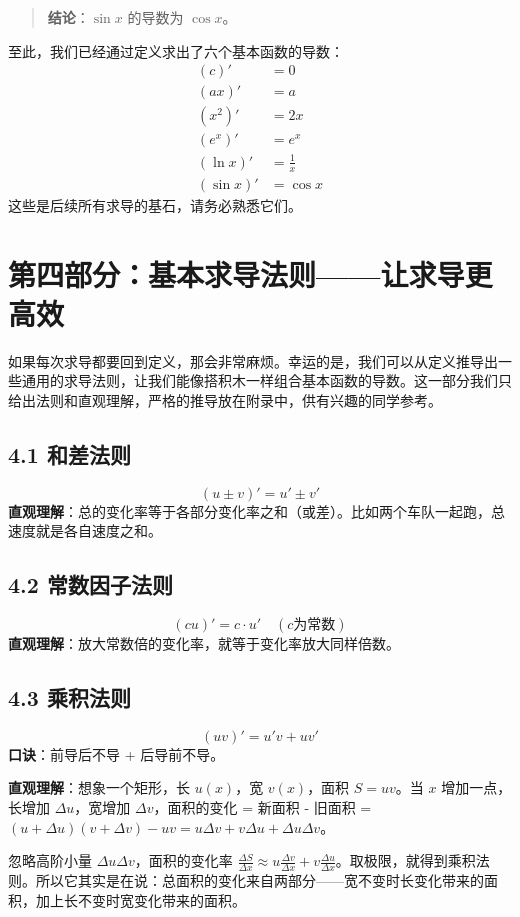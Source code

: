 \documentclass[10pt]{article}
\begin{document}
\begin{quote}
\textbf{结论}：$\sin x$ 的导数为 $\cos x$。
\end{quote}

至此，我们已经通过定义求出了六个基本函数的导数：
\[
\begin{aligned}
(c)' &= 0 \\
(ax)' &= a \\
(x^2)' &= 2x \\
(e^x)' &= e^x \\
(\ln x)' &= \frac{1}{x} \\
(\sin x)' &= \cos x
\end{aligned}
\]
这些是后续所有求导的基石，请务必熟悉它们。

\section*{第四部分：基本求导法则——让求导更高效}

如果每次求导都要回到定义，那会非常麻烦。幸运的是，我们可以从定义推导出一些通用的求导法则，让我们能像搭积木一样组合基本函数的导数。这一部分我们只给出法则和直观理解，严格的推导放在附录中，供有兴趣的同学参考。

\subsection*{4.1 和差法则}
\[
(u \pm v)' = u' \pm v'
\]
\textbf{直观理解}：总的变化率等于各部分变化率之和（或差）。比如两个车队一起跑，总速度就是各自速度之和。

\subsection*{4.2 常数因子法则}
\[
(cu)' = c \cdot u' \quad (c\text{为常数})
\]
\textbf{直观理解}：放大常数倍的变化率，就等于变化率放大同样倍数。

\subsection*{4.3 乘积法则}
\[
(uv)' = u'v + uv'
\]
\textbf{口诀}：前导后不导 + 后导前不导。

\textbf{直观理解}：想象一个矩形，长 $u(x)$，宽 $v(x)$，面积 $S = uv$。当 $x$ 增加一点，长增加 $\Delta u$，宽增加 $\Delta v$，面积的变化 = 新面积 - 旧面积 = $(u+\Delta u)(v+\Delta v) - uv = u\Delta v + v\Delta u + \Delta u\Delta v$。

忽略高阶小量 $\Delta u\Delta v$，面积的变化率 $\frac{\Delta S}{\Delta x} \approx u\frac{\Delta v}{\Delta x} + v\frac{\Delta u}{\Delta x}$。取极限，就得到乘积法则。所以它其实是在说：总面积的变化来自两部分——宽不变时长变化带来的面积，加上长不变时宽变化带来的面积。
\end{document}
